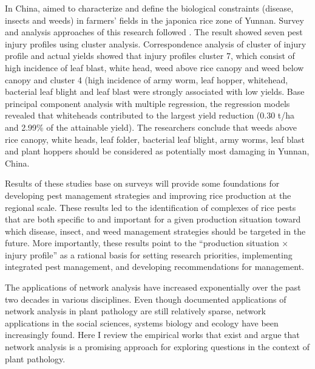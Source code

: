 In China, \cite{dong2010characterization} aimed to characterize and define the biological constraints (disease, insects and weeds) in farmers' fields in the japonica rice zone of Yunnan. Survey and analysis approaches of this research followed \cite{savary2000}. The result showed seven pest injury profiles using cluster analysis. Correspondence analysis of cluster of injury profile and actual yields showed that injury profiles cluster 7, which consist of high incidence of leaf blast, white head, weed above rice canopy and weed below canopy and cluster 4 (high incidence of army worm, leaf hopper, whitehead, bacterial leaf blight and leaf blast were strongly associated with low yields. Base principal component analysis with multiple regression, the regression models revealed that whiteheads contributed to the largest yield reduction (0.30 t/ha and 2.99\% of the attainable yield). The researchers conclude that weeds above rice canopy, white heads, leaf folder, bacterial leaf blight, army worms, leaf blast and plant hoppers should be considered as potentially most damaging in Yunnan, China.

Results of these studies base on surveys will provide some foundations for developing pest management strategies and improving rice production at the regional scale. These results led to the identification of complexes of rice pests that are both specific to and important for a given production situation toward which disease, insect, and weed management strategies should be targeted in the future. More importantly, these results point to the “production situation × injury profile” as a rational basis for setting research priorities, implementing integrated pest management, and developing recommendations for management.


The applications of network analysis have increased exponentially over the past two decades in various disciplines. Even though documented applications of network analysis in plant pathology are still relatively sparse, network applications in the social sciences, systems biology and ecology have been increasingly found. Here I review the empirical works that exist and argue that network analysis is a promising approach for exploring questions in the context of plant pathology.

